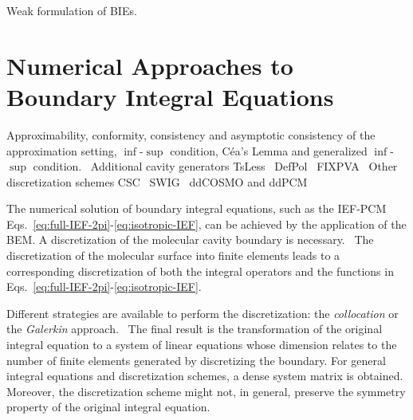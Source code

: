 Weak formulation of \acs{BIE}s.\autocite{Hsiao2008-xb}


\section{Numerical Approaches to Boundary Integral Equations}\label{sec:BEM}

Approximability, conformity, consistency and asymptotic consistency
of the approximation setting, $\inf$-$\sup$ condition, Céa's Lemma
and generalized $\inf$-$\sup$ condition.~\autocite{Ern2004-oo,
TesiFilippo}
Additional cavity generators
TsLess~\autocite{Pomelli2004-lb}
DefPol~\autocite{Pomelli1998-ob, Pomelli1999-dc}
FIXPVA~\autocite{Su2009-em}
Other discretization schemes
CSC~\autocite{York1999-xy, Scalmani2010-tw}
SWIG~\autocite{Lange2010-jp, Lange2010-qo, Lange2011-eu}
ddCOSMO and ddPCM~\autocite{Cances2013-jg, Lipparini2013-cy, Lipparini2014-to,
Lipparini2014-fq, Stamm2016-fv}


The numerical solution of boundary integral equations, such as the
\acs{IEF}-\acs{PCM}
Eqs.~\eqref{eq:full-IEF-2pi}-\eqref{eq:isotropic-IEF}, can be achieved
by the application of the \ac{BEM}.
A discretization of the molecular cavity
boundary is necessary.~\autocite{Pomelli2007-wq}
The discretization of the
molecular surface into finite elements leads to a corresponding
discretization of both the integral operators and the functions in
Eqs.~\eqref{eq:full-IEF-2pi}-\eqref{eq:isotropic-IEF}.

Different strategies are available to perform the
discretization: the \emph{collocation} or the \emph{Galerkin}
approach.~\cite{Hackbusch1995-uq, Ern2004-oo}
The final result is the transformation of
the original integral equation to a system of linear equations whose
dimension relates to the number of finite elements generated by
discretizing the boundary.  For general integral equations and
discretization schemes, a dense system matrix is obtained. Moreover, the
discretization scheme might not, in general, preserve the symmetry
property of the original integral equation.

